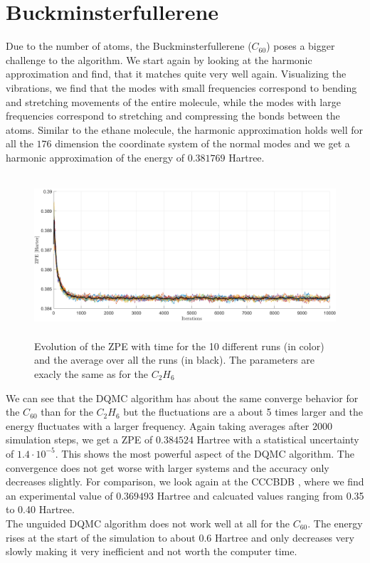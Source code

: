 \documentclass [12pt]{report}
\begin{document}

\section{Buckminsterfullerene}
Due to the number of atoms, the Buckminsterfullerene ($C_{60}$) poses a bigger challenge to the algorithm. We start again by looking at the harmonic approximation and find, that it matches quite very well again. Visualizing the vibrations, we find that the modes with small frequencies correspond to bending and stretching movements of the entire molecule, while the modes with large frequencies correspond to stretching and compressing the bonds between the atoms. 
Similar to the ethane molecule, the harmonic approximation holds well for all the $176$ dimension the coordinate system of the normal modes and we get a harmonic approximation of the energy of $0.381769$ Hartree.

\begin{figure}[h]
\includegraphics[width=\linewidth, height=6cm] {c60_1.png}
\caption{Evolution of the ZPE with time for the 10 different runs (in color) and the average over all the runs (in black). The parameters are exacly the same as for the $C_2H_6$} \label{c60_1}
\end{figure}

We can see that the DQMC algorithm has about the same converge behavior for the $C_{60}$ than for the $C_2H_6$ but the fluctuations are a about 5 times larger and the energy fluctuates with a larger frequency. Again taking averages after $2000$ simulation steps, we get a ZPE of $0.384524$ Hartree with a statistical uncertainty of $1.4 \cdot 10^{-5}$. This shows the most powerful aspect of the DQMC algorithm. The convergence does not get worse with larger systems and the accuracy only decreases slightly. For comparison, we look again at the CCCBDB \cite{cccbdb}, where we find an experimental value of  $0.369493$ Hartree and calcuated values ranging from 0.35 to 0.40 Hartree.\\
The unguided DQMC algorithm does not work well at all for the $C_{60}$. The energy rises at the start of the simulation to about 0.6 Hartree and only decreases very  slowly making it very inefficient and not worth the computer time.
\end{document}
